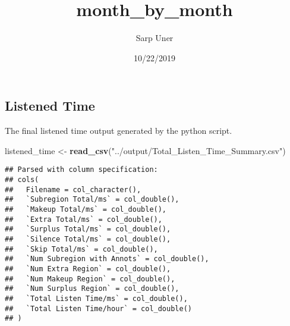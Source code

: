 \documentclass[]{article}
\title{month\_by\_month}
\author{Sarp Uner}
\date{10/22/2019}
\newenvironment{Shaded}{\begin{snugshade}}{\end{snugshade}}
\newcommand{\KeywordTok}[1]{\textcolor[rgb]{0.13,0.29,0.53}{\textbf{{#1}}}}
\newcommand{\DataTypeTok}[1]{\textcolor[rgb]{0.13,0.29,0.53}{{#1}}}
\newcommand{\DecValTok}[1]{\textcolor[rgb]{0.00,0.00,0.81}{{#1}}}
\newcommand{\CharTok}[1]{\textcolor[rgb]{0.31,0.60,0.02}{{#1}}}
\newcommand{\StringTok}[1]{\textcolor[rgb]{0.31,0.60,0.02}{{#1}}}
\newcommand{\NormalTok}[1]{{#1}}
\begin{document}
\maketitle

\subsection{Listened Time}\label{listened-time}

The final listened time output generated by the python script.

\begin{Shaded}
\begin{Highlighting}[]
\NormalTok{listened_time <-}\StringTok{ }\KeywordTok{read_csv}\NormalTok{(}\StringTok{"../output/Total_Listen_Time_Summary.csv"}\NormalTok{)}
\end{Highlighting}
\end{Shaded}

\begin{verbatim}
## Parsed with column specification:
## cols(
##   Filename = col_character(),
##   `Subregion Total/ms` = col_double(),
##   `Makeup Total/ms` = col_double(),
##   `Extra Total/ms` = col_double(),
##   `Surplus Total/ms` = col_double(),
##   `Silence Total/ms` = col_double(),
##   `Skip Total/ms` = col_double(),
##   `Num Subregion with Annots` = col_double(),
##   `Num Extra Region` = col_double(),
##   `Num Makeup Region` = col_double(),
##   `Num Surplus Region` = col_double(),
##   `Total Listen Time/ms` = col_double(),
##   `Total Listen Time/hour` = col_double()
## )
\end{verbatim}

\begin{Shaded}
\end{Shaded}
\end{document}
